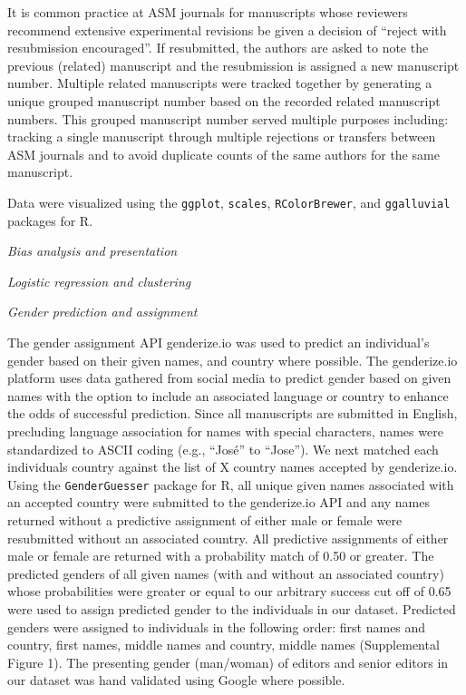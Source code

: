 \documentclass[11pt,]{article}
\begin{document}
It is common practice at ASM journals for manuscripts whose reviewers
recommend extensive experimental revisions be given a decision of
``reject with resubmission encouraged''. If resubmitted, the authors are
asked to note the previous (related) manuscript and the resubmission is
assigned a new manuscript number. Multiple related manuscripts were
tracked together by generating a unique grouped manuscript number based
on the recorded related manuscript numbers. This grouped manuscript
number served multiple purposes including: tracking a single manuscript
through multiple rejections or transfers between ASM journals and to
avoid duplicate counts of the same authors for the same manuscript.

Data were visualized using the \texttt{ggplot}, \texttt{scales},
\texttt{RColorBrewer}, and \texttt{ggalluvial} packages for R.

\emph{Bias analysis and presentation}

\emph{Logistic regression and clustering}

\emph{Gender prediction and assignment}

The gender assignment API genderize.io was used to predict an
individual's gender based on their given names, and country where
possible. The genderize.io platform uses data gathered from social media
to predict gender based on given names with the option to include an
associated language or country to enhance the odds of successful
prediction. Since all manuscripts are submitted in English, precluding
language association for names with special characters, names were
standardized to ASCII coding (e.g., ``José'' to ``Jose''). We next
matched each individuals country against the list of X country names
accepted by genderize.io. Using the \texttt{GenderGuesser} package for
R, all unique given names associated with an accepted country were
submitted to the genderize.io API and any names returned without a
predictive assignment of either male or female were resubmitted without
an associated country. All predictive assignments of either male or
female are returned with a probability match of 0.50 or greater. The
predicted genders of all given names (with and without an associated
country) whose probabilities were greater or equal to our arbitrary
success cut off of 0.65 were used to assign predicted gender to the
individuals in our dataset. Predicted genders were assigned to
individuals in the following order: first names and country, first
names, middle names and country, middle names (Supplemental Figure 1).
The presenting gender (man/woman) of editors and senior editors in our
dataset was hand validated using Google where possible.
\end{document}
